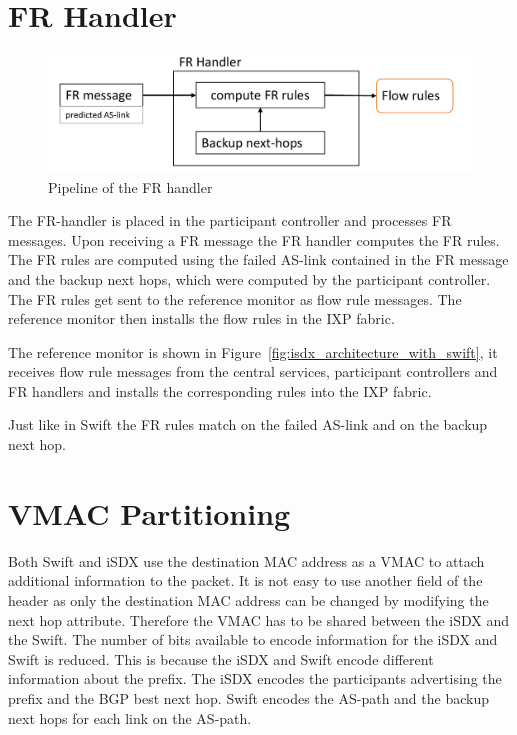 \section{\label{chapter4:FR-handler}FR Handler}

\begin{figure}[h]
\center
\includegraphics[scale = 0.6]{Figures/design_fr_handler_cropped.pdf}
\caption{Pipeline of the FR handler}
\end{figure}

The FR-handler is placed in the participant controller and processes FR messages.
Upon receiving a FR message the FR handler computes the FR rules. The FR rules are computed using the failed AS-link contained in the FR message and the backup next hops, which were computed by the participant controller. 
The FR rules get sent to the reference monitor as flow rule messages. The reference monitor then installs the flow rules in the IXP fabric.

The reference monitor is shown in Figure~\ref{fig:isdx_architecture_with_swift}, it receives flow rule messages from the central services, participant controllers and FR handlers and installs the corresponding rules into the IXP fabric. 

Just like in Swift the FR rules match on the failed AS-link and on the backup next hop.    

\newpage

\section{\label{chapter4:vmac_partitioning}VMAC Partitioning}

Both Swift and iSDX use the destination MAC address as a VMAC to attach additional information to the packet. It is not easy to use another field of the header as only the destination MAC address can be changed by modifying the next hop attribute. Therefore the VMAC has to be shared between the iSDX and the Swift. The number of bits available to encode information for the iSDX and Swift is reduced. This is because the iSDX and Swift encode different \\information about the prefix. The iSDX encodes the participants advertising the prefix and the BGP best next hop. Swift encodes the AS-path and the backup next hops for each link on the AS-path.


